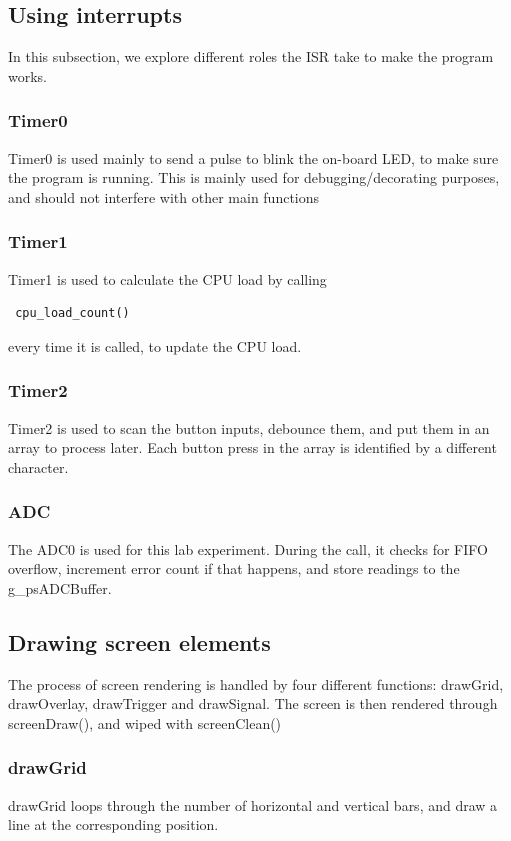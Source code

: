 \documentclass[12pt,oneside,letterpaper]{article}
\begin{document}
\subsection{Using interrupts}
In this subsection, we explore different roles the ISR take to make the program works.

\subsubsection{Timer0}
Timer0 is used mainly to send a pulse to blink the on-board LED, to make sure the program is running. This is mainly used for debugging/decorating purposes, and should not interfere with other main functions
\subsubsection{Timer1}
Timer1 is used to calculate the CPU load by calling \begin{verbatim} cpu_load_count() \end{verbatim} every time it is called, to update the CPU load.
\subsubsection{Timer2}
Timer2 is used to scan the button inputs, debounce them, and put them in an array to process later. Each button press in the array is identified by a different character.

\subsubsection{ADC}
The ADC0 is used for this lab experiment. During the call, it checks for FIFO overflow, increment error count if that happens, and store readings to the g\_psADCBuffer.

\subsection{Drawing screen elements}

The process of screen rendering is handled by four different functions: drawGrid, drawOverlay, drawTrigger and drawSignal. The screen is then rendered through screenDraw(), and wiped with screenClean()

\subsubsection{drawGrid}
drawGrid loops through the number of horizontal and vertical bars, and draw a line at the corresponding position.
\end{document}
